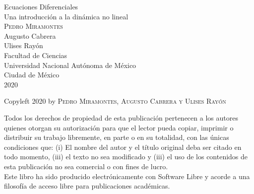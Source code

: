 \documentclass[letterpaper,12pt,twoside]{report}
\begin{document}

\thispagestyle{empty}
\vspace{20 mm}
\begin{center}
\Huge
Ecuaciones Diferenciales\\
\Large Una introducción a la dinámica no lineal\\
      
\Large
\vspace{15mm}
\textsc{Pedro Miramontes}\\
Augusto Cabrera\\
Ulises Rayón\\
\Large
\large
Facultad de Ciencias\\
Universidad Nacional Aut\'onoma de M\'exico\\
\vspace{90 mm}
Ciudad de M\'exico\hspace{1mm}  \\
  
2020\\
\normalsize

\pagebreak
\thispagestyle{empty}
\vspace{20 mm}

 
\vspace{5 mm}
\large
Copyleft 2020 by \textsc{Pedro Miramontes, Augusto Cabrera y Ulises Rayón}\\
\normalsize
\vspace{10 mm}

\vspace{10 mm}
Todos los derechos de propiedad de esta publicaci\'on pertenecen a los autores
quienes otorgan su autorizaci\'on para que el lector pueda copiar,
imprimir o distribuir su trabajo libremente, en parte o en su totalidad, con las
\'unicas condiciones que: (i) El nombre del autor y el t\'itulo original deba ser citado en todo
momento, (iii) el texto no sea modificado y (iii) el uso de los
contenidos de esta publicaci\'on no sea comercial o con fines de lucro.\\



\vspace{60 mm}
Este libro ha sido producido electr\'onicamente con Software Libre
y acorde a una filosof\'ia de acceso libre para publicaciones acad\'emicas.
\end{center}

\newpage


\newpage
\end{document}
